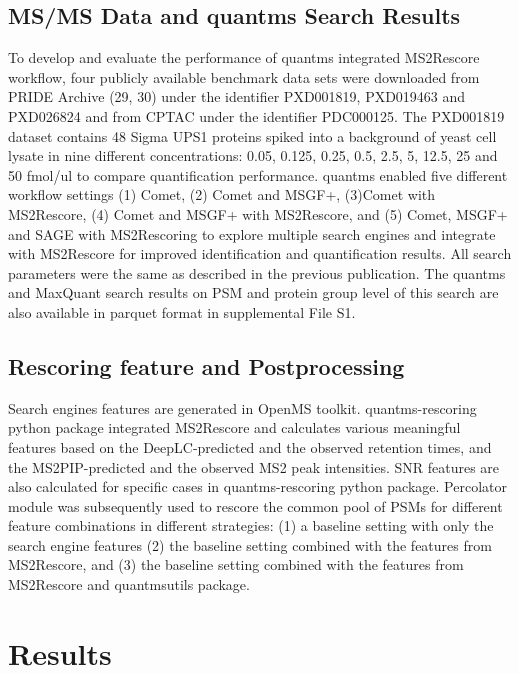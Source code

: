 \documentclass[12pt]{article}
\begin{document}
\subsection{MS/MS Data and quantms Search Results}
To develop and evaluate the performance of quantms integrated MS2Rescore workflow, four publicly available benchmark data sets were downloaded from PRIDE Archive (29, 30) under the identifier PXD001819, PXD019463 and PXD026824 and from CPTAC under the identifier PDC000125. The PXD001819 dataset contains 48 Sigma UPS1 proteins spiked into a background of yeast cell lysate in nine different concentrations: 0.05, 0.125, 0.25, 0.5, 2.5, 5, 12.5, 25 and 50 fmol/ul to compare quantification performance. quantms enabled five different workflow settings (1) Comet, (2) Comet and MSGF+, (3)Comet with MS2Rescore, (4) Comet and MSGF+ with MS2Rescore, and (5) Comet, MSGF+ and SAGE with MS2Rescoring to explore multiple search engines and integrate with MS2Rescore for improved identification and quantification results. All search parameters were the same as described in the previous publication. The quantms and MaxQuant search results on PSM and protein group level of this search are also available in parquet format in supplemental File S1.


\subsection{Rescoring feature and Postprocessing}
Search engines features are generated in OpenMS toolkit. quantms-rescoring python package integrated MS2Rescore and calculates various meaningful features based on the DeepLC-predicted and the observed retention times, and the MS2PIP-predicted and the observed MS2 peak intensities. SNR features are also calculated for specific cases in quantms-rescoring python package. Percolator module was subsequently used to rescore the common pool of PSMs for different feature combinations in different strategies: (1) a baseline setting with only the search engine features (2) the baseline setting combined with the features from MS2Rescore, and (3) the baseline setting combined with the features from MS2Rescore and quantmsutils package. 


\section{Results}
\end{document}

